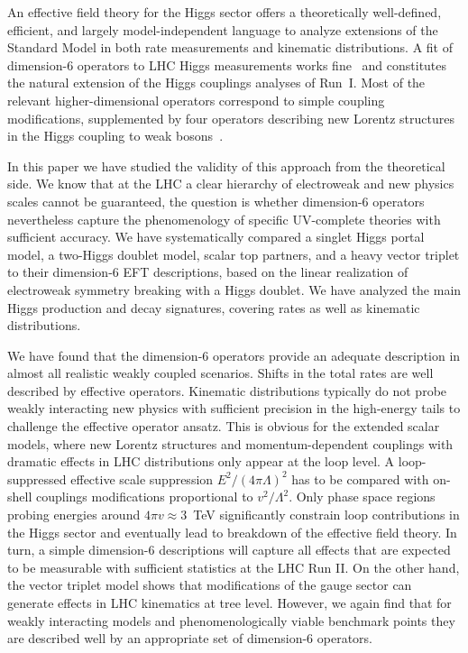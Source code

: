 An effective field theory for the Higgs sector offers a theoretically
well-defined, efficient, and largely model-independent language to
analyze extensions of the Standard Model in both rate measurements and
kinematic distributions. A fit of dimension-6 operators to LHC Higgs
measurements works fine~\cite{Corbett:2015ksa} and constitutes the
natural extension of the Higgs couplings analyses of Run~I.  Most of
the relevant higher-dimensional operators correspond to simple
coupling modifications, supplemented by four operators describing new
Lorentz structures in the Higgs coupling to weak
bosons~\cite{Corbett:2015ksa}.

In this paper we have studied the validity of this approach from the
theoretical side.  We know that at the LHC a clear hierarchy of
electroweak and new physics scales cannot be guaranteed, the question
is whether dimension-6 operators nevertheless capture the
phenomenology of specific UV-complete theories with sufficient
accuracy.  We have systematically compared a singlet Higgs portal
model, a two-Higgs doublet model, scalar top partners, and a heavy
vector triplet to their dimension-6 EFT descriptions, based on the
linear realization of electroweak symmetry breaking with a Higgs
doublet.  We have analyzed the main Higgs production and decay
signatures, covering rates as well as kinematic distributions.\medskip

We have found that the dimension-6 operators provide an adequate
description in almost all realistic weakly coupled scenarios. Shifts
in the total rates are well described by effective operators.
Kinematic distributions typically do not probe weakly interacting new
physics with sufficient precision in the high-energy tails to
challenge the effective operator ansatz.  This is obvious for the
extended scalar models, where new Lorentz structures and
momentum-dependent couplings with dramatic effects in LHC
distributions only appear at the loop level.  A loop-suppressed
effective scale suppression $E^2/(4 \pi \Lambda)^2$ has to be compared
with on-shell couplings modifications proportional to $v^2/\Lambda^2$.
Only phase space regions probing energies around $4 \pi v \approx
3$~TeV significantly constrain loop contributions in the Higgs sector
and eventually lead to breakdown of the effective field theory. In
turn, a simple dimension-6 descriptions will capture all effects that
are expected to be measurable with sufficient statistics at the LHC
Run II.  On the other hand, the vector triplet model shows that
modifications of the gauge sector can generate effects in LHC
kinematics at tree level. However, we again find that for weakly
interacting models and phenomenologically viable benchmark points they
are described well by an appropriate set of dimension-6
operators.\medskip

